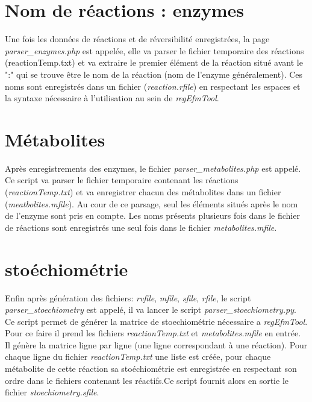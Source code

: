 \section{Nom de réactions : enzymes}
Une fois les données de réactions et de réversibilité enregistrées, la page \emph{parser\_enzymes.php} est appelée, elle va parser le fichier temporaire des réactions  (reactionTemp.txt) et va extraire le premier élément de la réaction situé avant le ":" qui se trouve être le nom de la réaction (nom de l'enzyme généralement).
Ces noms sont enregistrés dans un fichier (\emph{reaction.rfile}) en respectant les espaces et la syntaxe nécessaire à l'utilisation au sein de \emph{regEfmTool}.

\section{Métabolites}
Après enregistrements des enzymes, le fichier \emph{parser\_metabolites.php} est appelé. Ce script va parser le fichier temporaire contenant les réactions (\emph{reactionTemp.txt}) et va enregistrer chacun des métabolites dans un fichier (\emph{meatbolites.mfile}). Au cour de ce parsage, seul les éléments situés après le nom de l'enzyme sont pris en compte. Les noms présents plusieurs fois dans le fichier de réactions sont enregistrés une seul fois dans le fichier \emph{metabolites.mfile}.

\section{stoéchiométrie}
Enfin après génération des fichiers: \emph{rvfile}, \emph{mfile}, \emph{sfile}, \emph{rfile}, le script \emph{parser\_stoechiometry} est appelé, il va lancer le script \emph{parser\_stoechiometry.py}. Ce script permet de générer la matrice de stoechiométrie nécessaire a \emph{regEfmTool}. Pour ce faire il prend les fichiers \emph{reactionTemp.txt} et \emph{metabolites.mfile} en entrée. Il génère la matrice ligne par ligne (une ligne correspondant à une réaction). Pour chaque ligne du fichier \emph{reactionTemp.txt} une liste est créée, pour chaque métabolite de cette réaction sa stoéchiométrie est enregistrée en respectant son ordre dans le fichiers contenant les réactifs.Ce script fournit alors en sortie le fichier \emph{stoechiometry.sfile}.

